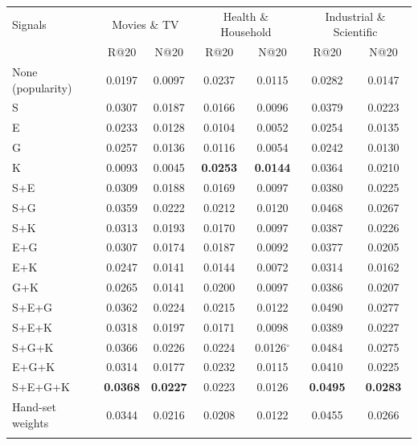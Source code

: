 \setlength{\tabcolsep}{3pt}
\begin{tabular*}{\hsize}{@{\extracolsep{\fill}}lcccccc@{}}
\toprule
Signals & \multicolumn{2}{c}{Movies \& TV} & \multicolumn{2}{c}{Health \& Household} & \multicolumn{2}{c}{Industrial \& Scientific} \\
 & R@20 & N@20 & R@20 & N@20 & R@20 & N@20 \\
\colrule
None (popularity) & 0.0197 & 0.0097 & 0.0237 & 0.0115 & 0.0282 & 0.0147 \\
\colrule
S & 0.0307 & 0.0187 & 0.0166 & 0.0096 & 0.0379 & 0.0223 \\
E & 0.0233 & 0.0128 & 0.0104 & 0.0052 & 0.0254 & 0.0135 \\
G & 0.0257 & 0.0136 & 0.0116 & 0.0054 & 0.0242 & 0.0130 \\
K & 0.0093 & 0.0045 & \textbf{0.0253} & \textbf{0.0144} & 0.0364 & 0.0210 \\
\colrule
S+E & 0.0309 & 0.0188 & 0.0169 & 0.0097 & 0.0380 & 0.0225 \\
S+G & 0.0359 & 0.0222 & 0.0212 & 0.0120 & 0.0468 & 0.0267 \\
S+K & 0.0313 & 0.0193 & 0.0170 & 0.0097 & 0.0387 & 0.0226 \\
E+G & 0.0307 & 0.0174 & 0.0187 & 0.0092 & 0.0377 & 0.0205 \\
E+K & 0.0247 & 0.0141 & 0.0144 & 0.0072 & 0.0314 & 0.0162 \\
G+K & 0.0265 & 0.0141 & 0.0200 & 0.0097 & 0.0386 & 0.0207 \\
\colrule
S+E+G & 0.0362 & 0.0224 & 0.0215 & 0.0122 & 0.0490 & 0.0277 \\
S+E+K & 0.0318 & 0.0197 & 0.0171 & 0.0098 & 0.0389 & 0.0227 \\
S+G+K & 0.0366 & 0.0226 & 0.0224 & 0.0126$^{\circ}$ & 0.0484 & 0.0275 \\
E+G+K & 0.0314 & 0.0177 & 0.0232 & 0.0115 & 0.0410 & 0.0225 \\
\colrule
S+E+G+K & \textbf{0.0368} & \textbf{0.0227} & 0.0223 & 0.0126 & \textbf{0.0495} & \textbf{0.0283} \\
\colrule
Hand-set weights & 0.0344 & 0.0216 & 0.0208 & 0.0122 & 0.0455 & 0.0266 \\
\botrule
\end{tabular*}
